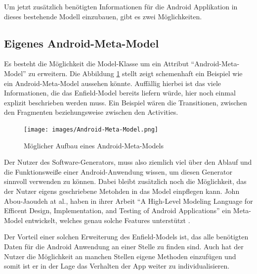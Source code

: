 Um jetzt zusätzlich benötigten Informationen für die Android Applikation in dieses bestehende Modell einzubauen, gibt es zwei Möglichkeiten.

\subsection{Eigenes Android-Meta-Model}

Es besteht die Möglichkeit die Model-Klasse um ein Attribut \enquote{Android-Meta-Model} zu erweitern.
Die Abbildung \ref{fig:android-model} stellt zeigt schemenhaft ein Beispiel wie ein Android-Meta-Model aussehen könnte. Auffällig hierbei ist das viele Informationen, die das Enfield-Model bereits liefern würde, hier noch einmal explizit beschrieben werden muss. Ein Beispiel wären die Transitionen, zwischen den Fragmenten beziehungsweise zwischen den Activities. 


\begin{figure}[H]
	\begin{center}
		\texttt{[image: images/Android-Meta-Model.png]}
		\caption{Möglicher Aufbau eines Android-Meta-Models}
		\label{fig:android-model}
	\end{center}
\end{figure}

Der Nutzer des Software-Generators, muss also ziemlich viel über den Ablauf und die Funktionsweiße einer Android-Anwendung wissen, um diesen Generator sinnvoll verwenden zu können.
Dabei bleibt zusätzlich noch die Möglichkeit, das der Nutzer eigens geschriebene Metohden in das Model einpflegen kann. John Abou-Jaoudeh at al., haben in ihrer Arbeit \enquote{A High-Level Modeling Language for Efficent Design, Implementation, and Testing of Android Applications} ein Meta-Model entwickelt, welches genau solche Features unterstützt \cite{abou2015high}.

Der Vorteil einer solchen Erweiterung des Enfield-Models ist, das alle benötigten Daten für die Android Anwendung an einer Stelle zu finden sind. Auch hat der Nutzer die Möglichkeit an manchen Stellen eigene Methoden einzufügen und somit ist er in der Lage das Verhalten der App weiter zu individualisieren.

